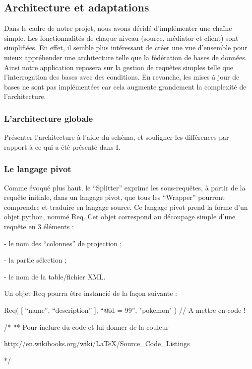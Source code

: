 \subsection{Architecture et adaptations}

Dans le cadre de notre projet, nous avons décidé d’implémenter une chaîne simple. Les fonctionnalités de chaque niveau (source, médiator et client) sont simplifiées. En effet, il semble plus intéressant de créer une vue d’ensemble pour mieux appréhender une architecture telle que la fédération de bases de données. Ainsi notre application reposera sur la gestion de requêtes simples telle que l’interrogation des bases avec des conditions. En revanche, les mises à jour de bases ne sont pas implémentées car cela augmente grandement la complexité de l’architecture.

\subsubsection{L’architecture globale}


Présenter l’architecture à l’aide du schéma, et souligner les différences par rapport à ce qui a été présenté dans I.

\subsubsection{Le langage pivot}

Comme évoqué plus haut, le “Splitter” exprime les sous-requêtes, à partir de la requête initiale, dans un langage pivot, que tous les “Wrapper” pourront comprendre et traduire en langage source. Ce langage pivot prend la forme d’un objet python, nommé Req. Cet objet correspond au découpage simple d’une requête en 3 éléments :

    - le nom des “colonnes” de projection ;

    - la partie sélection ;

    - le nom de la table/fichier XML.


Un objet Req pourra être instancié de la façon suivante :

Req( [ “name”, “description” ], “@id = 99”, "pokemon" ) // A mettre en code !

/* ** Pour inclure du code et lui donner de la couleur

http://en.wikibooks.org/wiki/LaTeX/Source\_Code\_Listings

*/

